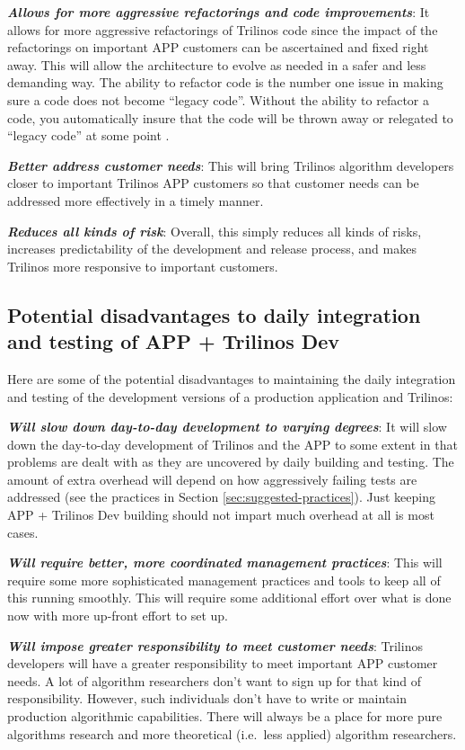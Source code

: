 \documentclass[pdf,ps2pdf,11pt]{SANDreport}
\begin{document}
{}\textit{\textbf{Allows for more aggressive refactorings and code
improvements}}: It allows for more aggressive refactorings of Trilinos code
since the impact of the refactorings on important APP customers can be
ascertained and fixed right away.  This will allow the architecture to evolve
as needed in a safer and less demanding way.  The ability to refactor code is
the number one issue in making sure a code does not become ``legacy code''.
Without the ability to refactor a code, you automatically insure that the code
will be thrown away or relegated to ``legacy code'' at some point
{}\cite{book:code-complete-2}.

{}\textit{\textbf{Better address customer needs}}: This will bring Trilinos
algorithm developers closer to important Trilinos APP customers so that
customer needs can be addressed more effectively in a timely manner.

{}\textit{\textbf{Reduces all kinds of risk}}: Overall, this simply reduces all
kinds of risks, increases predictability of the development and release
process, and makes Trilinos more responsive to important customers.


%
{}\subsection{Potential disadvantages to daily integration and testing of APP +
Trilinos Dev}
%

Here are some of the potential disadvantages to maintaining the daily
integration and testing of the development versions of a production
application and Trilinos:

{}\textit{\textbf{Will slow down day-to-day development to varying degrees}}:
It will slow down the day-to-day development of Trilinos and the APP to some
extent in that problems are dealt with as they are uncovered by daily building
and testing.  The amount of extra overhead will depend on how aggressively
failing tests are addressed (see the practices in Section
{}\ref{sec:suggested-practices}).  Just keeping APP + Trilinos Dev building
should not impart much overhead at all is most cases.

{}\textit{\textbf{Will require better, more coordinated management practices}}:
This will require some more sophisticated management practices and tools to
keep all of this running smoothly.  This will require some additional effort
over what is done now with more up-front effort to set up.

{}\textit{\textbf{Will impose greater responsibility to meet customer needs}}:
Trilinos developers will have a greater responsibility to meet important APP
customer needs.  A lot of algorithm researchers don't want to sign up for that
kind of responsibility.  However, such individuals don't have to write or
maintain production algorithmic capabilities.  There will always be a place
for more pure algorithms research and more theoretical (i.e.\ less applied)
algorithm researchers.
\end{document}
